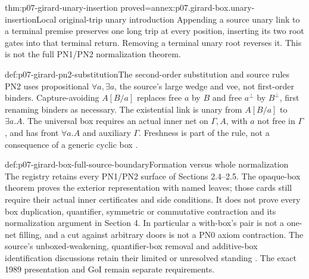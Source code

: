 \begin{hblemma}{thm:p07-girard-unary-insertion}
 {proved=annex:p07.girard-box.unary-insertion}{Local original-trip unary introduction}
Appending a source unary link to a terminal premise preserves one
long trip at every position, inserting its two root gates into that
terminal return. Removing a terminal unary root reverses it.
This is not the full PN1/PN2 normalization theorem.
\end{hblemma}

\begin{hbdefinition}{def:p07-girard-pn2-substitution}{The second-order substitution and source rules}
PN2 uses propositional \(\forall a,\exists a\), the source's large
wedge and vee, not first-order binders.
Capture-avoiding \(A[B/a]\) replaces free \(a\) by \(B\) and free
\(a^\perp\) by \(B^\perp\), first renaming binders as necessary.
The existential link is unary from \(A[B/a]\) to \(\exists a.A\).
The universal box requires an actual inner net on \(\Gamma,A\),
with \(a\) not free in \(\Gamma\), and has front \(\forall a.A\)
and auxiliary \(\Gamma\). Freshness is part of the rule, not a
consequence of a generic cyclic box
\cite[pp.~46--47]{Girard1987AuthorHosted}.
\end{hbdefinition}

\begin{proofboundary}{def:p07-girard-box-full-source-boundary}{Formation versus whole normalization}
The registry retains every PN1/PN2 surface of Sections 2.4--2.5.
The opaque-box theorem proves the exterior representation with named
leaves; those cards still require their actual inner certificates and
side conditions. It does not prove every box duplication, quantifier,
symmetric or commutative contraction and its normalization argument
in Section 4. In particular a with-box's pair is not a one-net filling,
and a cut against arbitrary doors is not a PN0 axiom contraction.
The source's unboxed-weakening, quantifier-box removal and additive-box
identification discussions retain their limited or unresolved standing
\cite[p.~47]{Girard1987AuthorHosted}. The exact 1989 presentation and
GoI remain separate requirements.
\end{proofboundary}

